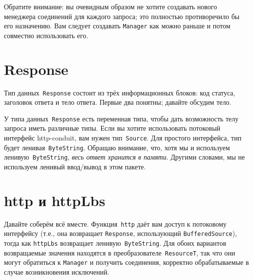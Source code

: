 Обратите внимание: вы очевидным образом не хотите создавать нового
менеджера соединений для каждого запроса; это полностью противоречило бы
его назначению. Вам следует создавать \lstinline!Manager! как можно
раньше и потом совместно использовать его.

\section{Response}
Тип данных~\lstinline!Response! состоит из трёх информационных блоков:
код статуса, заголовок ответа и тело ответа. Первые два понятны;
давайте обсудим тело.

У типа данных~\lstinline!Response! есть переменная типа, чтобы дать
возможность телу запроса иметь различные типы. Если вы хотите
использовать потоковый интерфейс http-conduit, вам нужен
тип~\lstinline!Source!. Для простого интерфейса, тип будет
ленивая~\lstinline!ByteString!. Обращаю внимание, что, хотя мы и
используем ленивую~\lstinline!ByteString!, \emph{весь ответ хранится в
памяти}. Другими словами, мы не используем ленивый ввод/вывод в этом
пакете.


\section{http и httpLbs}
Давайте соберём всё вместе. Функция~\lstinline!http! даёт вам доступ к
потоковому интерфейсу (т.е., она возвращает \lstinline!Response!,
использующий \lstinline!BufferedSource!), тогда как
\lstinline!httpLbs! возвращает ленивую~\lstinline!ByteString!. Для
обоих вариантов возвращаемые значения находятся в
преобразователе~\lstinline!ResourceT!, так что они могут
обратиться к \lstinline!Manager! и получить соединения, корректно
обрабатываемые в случае возникновения исключений.

